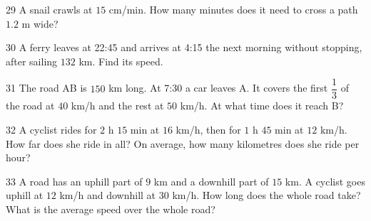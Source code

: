 \gap
\begin{probbox}{29}{\relax}
A snail crawls at $15$ cm/min. How many minutes does it need to cross a path $1.2$ m wide?
\end{probbox}
\gap
\begin{probbox}{30}{\relax}
A ferry leaves at 22:45 and arrives at 4:15 the next morning without stopping, after sailing $132$ km. Find its speed.
\end{probbox}
\begin{probbox}{31}{}
The road AB is $150$ km long. At 7:30 a car leaves A. It covers the first $\dfrac13$ of the road at $40$ km/h and the rest at $50$ km/h. At what time does it reach B?
\end{probbox}
\gap
\begin{probbox}{32}{}
A cyclist rides for $2$ h $15$ min at $16$ km/h, then for $1$ h $45$ min at $12$ km/h. How far does she ride in all? On average, how many kilometres does she ride per hour?
\end{probbox}
\gap
\begin{probbox}{33}{}
A road has an uphill part of $9$ km and a downhill part of $15$ km. A cyclist goes uphill at $12$ km/h and downhill at $30$ km/h. How long does the whole road take? What is the average speed over the whole road?
\end{probbox}

